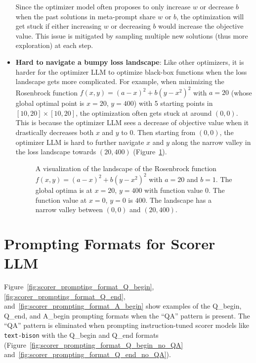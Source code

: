 \begin{itemize}[leftmargin=2em,topsep=0pt,partopsep=1ex,parsep=0ex]
Since the optimizer model often proposes to only increase $w$ or decrease $b$ when the past solutions in meta-prompt share $w$ or $b$, the optimization will get stuck if either increasing $w$ or decreasing $b$ would increase the objective value.
This issue is mitigated by sampling multiple new solutions (thus more exploration) at each step.
\item \textbf{Hard to navigate a bumpy loss landscape}: Like other optimizers, it is harder for the optimizer LLM to optimize black-box functions when the loss landscape gets more complicated.
For example, when minimizing the Rosenbrock function $f(x, y) = (a - x)^2 + b (y - x^2)^2$ with $a=20$ (whose global optimal point is $x=20$, $y=400$) with 5 starting points in $[10, 20] \times [10, 20]$, the optimization often gets stuck at around $(0, 0)$.
This is because the optimizer LLM sees a decrease of objective value when it drastically decreases both $x$ and $y$ to $0$.
Then starting from $(0, 0)$, the optimizer LLM is hard to further navigate $x$ and $y$ along the narrow valley in the loss landscape towards $(20, 400)$ (Figure~\ref{fig:rosenbrock_visualization}).

\begin{figure}[H]
\centering
{}
\caption{A visualization of the landscape of the Rosenbrock function $f(x, y) = (a - x)^2 + b (y - x^2)^2$ with $a=20$ and $b=1$.
The global optima is at $x=20$, $y=400$ with function value $0$.
The function value at $x=0$, $y=0$ is $400$.
The landscape has a narrow valley between $(0, 0)$ and $(20, 400)$.
}
\label{fig:rosenbrock_visualization}
\end{figure}

\end{itemize}

\section{Prompting Formats for Scorer LLM}
\label{appsec:scorer_prompting_formats}
Figure~\ref{fig:scorer_prompting_format_Q_begin}, \ref{fig:scorer_prompting_format_Q_end}, and~\ref{fig:scorer_prompting_format_A_begin} show examples of the Q\_begin, Q\_end, and A\_begin prompting formats when the ``QA'' pattern is present.
The ``QA'' pattern is eliminated when prompting instruction-tuned scorer models like \texttt{text-bison} with the Q\_begin and Q\_end formats (Figure~\ref{fig:scorer_prompting_format_Q_begin_no_QA} and~\ref{fig:scorer_prompting_format_Q_end_no_QA}).

